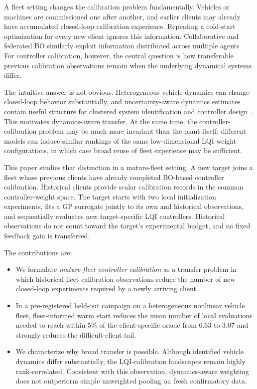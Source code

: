 \documentclass[conference]{IEEEtran}
\begin{document}
A fleet setting changes the calibration problem fundamentally. Vehicles or machines are commissioned one after another, and earlier clients may already have accumulated closed-loop calibration experience. Repeating a cold-start optimization for every new client ignores this information. Collaborative and federated BO similarly exploit information distributed across multiple agents~\cite{dai2020fts,dai2021dpfts,chen2025collaborative}. For controller calibration, however, the central question is how transferable previous calibration observations remain when the underlying dynamical systems differ.

The intuitive answer is not obvious. Heterogeneous vehicle dynamics can change closed-loop behavior substantially, and uncertainty-aware dynamics estimates contain useful structure for clustered system identification and controller design~\cite{weber2026ifac}. This motivates dynamics-aware transfer. At the same time, the controller-calibration problem may be much more invariant than the plant itself: different models can induce similar rankings of the same low-dimensional LQI weight configurations, in which case broad reuse of fleet experience may be sufficient.

This paper studies that distinction in a mature-fleet setting. A new target joins a fleet whose previous clients have already completed BO-based controller calibration. Historical clients provide scalar calibration records in the common controller-weight space. The target starts with two local initialization experiments, fits a GP surrogate jointly to its own and historical observations, and sequentially evaluates new target-specific LQI controllers. Historical observations do not count toward the target's experimental budget, and no fixed feedback gain is transferred.

The contributions are:
\begin{itemize}
    \item We formulate \emph{mature-fleet controller calibration} as a transfer problem in which historical fleet calibration observations reduce the number of new closed-loop experiments required by a newly arriving client.
    \item In a pre-registered held-out campaign on a heterogeneous nonlinear vehicle fleet, fleet-informed warm start reduces the mean number of local evaluations needed to reach within 5\% of the client-specific oracle from 6.63 to 3.07 and strongly reduces the difficult-client tail.
    \item We characterize why broad transfer is possible. Although identified vehicle dynamics differ substantially, the LQI-calibration landscapes remain highly rank-correlated. Consistent with this observation, dynamics-aware weighting does not outperform simple unweighted pooling on fresh confirmatory data.
\end{itemize}
\end{document}
